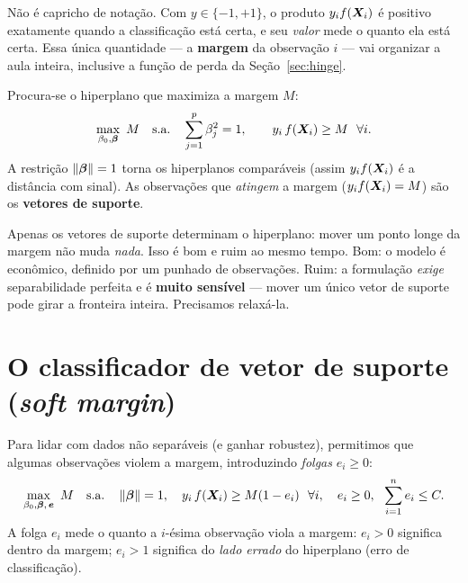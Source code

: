 \documentclass[11pt,a4paper]{article}
\begin{document}
\begin{ideia}
Não é capricho de notação. Com $y\in\{-1,+1\}$, o produto $y_i f(\bm{X}_i)$ é positivo
exatamente quando a classificação está certa, e seu \emph{valor} mede o quanto ela
está certa. Essa única quantidade --- a \textbf{margem} da observação $i$ --- vai
organizar a aula inteira, inclusive a função de perda da
Seção~\ref{sec:hinge}.
\end{ideia}

\begin{definicao}
Procura-se o hiperplano que maximiza a margem $M$:
\[
  \max_{\beta_0,\bm{\beta}}\ M \quad\text{s.a.}\quad
  \sum_{j=1}^p \beta_j^2 = 1,\qquad
  y_i\,f(\bm{X}_i)\ge M \ \ \forall i.
\]
A restrição $\left\lVert \bm{\beta} \right\rVert=1$ torna os hiperplanos comparáveis (assim $y_if(\bm{X}_i)$
é a distância com sinal). As observações que \emph{atingem} a margem
($y_if(\bm{X}_i)=M$) são os \textbf{vetores de suporte}.
\end{definicao}

\begin{atencao}
Apenas os vetores de suporte determinam o hiperplano: mover um ponto longe da
margem não muda \emph{nada}. Isso é bom e ruim ao mesmo tempo. Bom: o modelo é
econômico, definido por um punhado de observações. Ruim: a formulação \emph{exige}
separabilidade perfeita e é \textbf{muito sensível} --- mover um único vetor de
suporte pode girar a fronteira inteira. Precisamos relaxá-la.
\end{atencao}

\section{O classificador de vetor de suporte (\emph{soft margin})}
Para lidar com dados não separáveis (e ganhar robustez), permitimos que algumas
observações violem a margem, introduzindo \emph{folgas} $e_i\ge 0$:
\begin{equation}\label{eq:soft}
  \max_{\beta_0,\bm{\beta},\,\bm{e}}\ M \quad\text{s.a.}\quad
  \left\lVert \bm{\beta} \right\rVert=1,\quad
  y_i\,f(\bm{X}_i)\ge M(1-e_i)\ \ \forall i,\quad
  e_i\ge 0,\ \ \sum_{i=1}^n e_i \le C.
\end{equation}
A folga $e_i$ mede o quanto a $i$-ésima observação viola a margem: $e_i>0$ significa
dentro da margem; $e_i>1$ significa do \emph{lado errado} do hiperplano (erro de
classificação).
\end{document}
